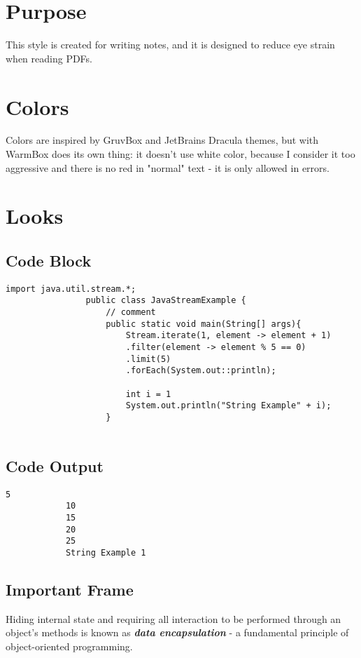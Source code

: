    \section{Purpose}
        This style is created for writing notes, and it is designed to reduce eye strain when reading PDFs.
    \section{Colors}
        Colors are inspired by GruvBox and JetBrains Dracula themes, but with WarmBox does its own thing: it doesn't use white color, because I consider it too aggressive and 
        there is no red in "normal" text - it is only allowed in errors.
    \section{Looks}
        \subsection{Code Block}
            \begin{lstlisting}[style=myjava]
                import java.util.stream.*;  
                public class JavaStreamExample { 
                    // comment
                    public static void main(String[] args){  
                        Stream.iterate(1, element -> element + 1)  
                        .filter(element -> element % 5 == 0)  
                        .limit(5)  
                        .forEach(System.out::println);  

                        int i = 1
                        System.out.println("String Example" + i);
                    }  
                
            \end{lstlisting}

        \subsection{Code Output}
        \begin{lstlisting}[style=myout]
            5
            10
            15
            20
            25   
            String Example 1        
        \end{lstlisting}
        \subsection{Important Frame}
        
        \begin{mdframed}[style=important]
            
            
            Hiding internal state and requiring all interaction to be performed through an object's methods is known as
            \textbf{\textit{data encapsulation}} - a fundamental principle of object-oriented programming.
        \end{mdframed}




        
    

